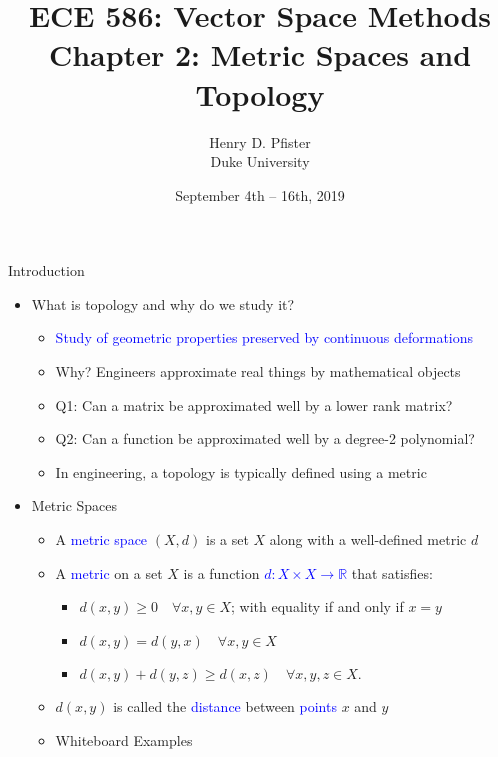 \documentclass[10pt,english]{beamer}
\newif\ifslow
\begin{document}
\ifslow

\title{ECE 586: Vector Space Methods \\ Chapter 2: Metric Spaces and Topology}
\author{Henry D. Pfister \\ Duke University}
\date{September 4th -- 16th, 2019}
\maketitle

\begin{frame}{Introduction}

\begin{itemize}
\setlength\itemsep{3mm}
\item<1-> What is topology and why do we study it? \vspace{1mm}
\begin{itemize} 
  \setlength\itemsep{1.5mm}
  \item<1-> \textcolor{blue}{Study of geometric properties preserved by continuous deformations}
  \item<2-> Why? Engineers approximate real things by mathematical objects
  \item<2-> Q1: Can a matrix be approximated well by a lower rank matrix?
  \item<2-> Q2: Can a function be approximated well by a degree-2 polynomial?
  \item<2-> In engineering, a topology is typically defined using a metric
\end{itemize}

\vspace{1mm}

\item<3-> Metric Spaces \vspace{1mm}
\begin{itemize} 
  \setlength\itemsep{1.5mm}
  \item A \textcolor{blue}{metric space} $(X,d)$ is a set $X$ along with a well-defined metric $d$
  \item A \textcolor{blue}{metric} on a set $X$ is a function \textcolor{blue}{$d \colon X \times X \rightarrow \mathbb{R} $} that satisfies: \vspace{1mm}
  \begin{itemize}
  \setlength\itemsep{1.5mm}
  \item $d(x,y) \geq 0 \quad \forall x, y \in X$; with equality if and only if $x = y$
  \item $d(x,y) = d(y,x) \quad \forall x, y \in X$
  \item $d(x,y) + d(y,z) \geq d(x,z) \quad \forall x, y, z \in X$.
  \end{itemize}
  \item $d(x,y)$ is called the \textcolor{blue}{distance} between \textcolor{blue}{points} $x$ and $y$
  \item Whiteboard Examples
\end{itemize}
\end{itemize}
\end{frame}
\end{document}
